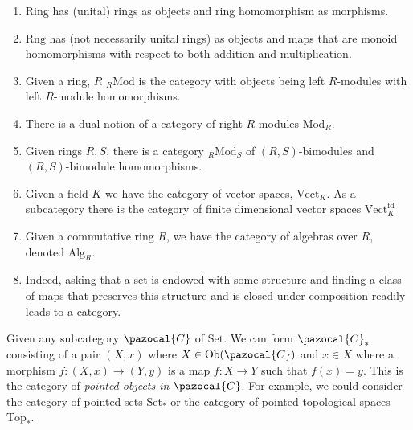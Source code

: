 \begin{example}
\begin{enumerate}
        \item $\mathrm{Ring}$ has (unital) rings as objects and ring homomorphism as morphisms. 
        \item $\mathrm{Rng}$ has (not necessarily unital rings) as objects and maps that are monoid homomorphisms with respect to both addition and multiplication. 
        \item Given a ring, $R$ $_R\mathrm{Mod}$ is the category with objects being left $R$-modules with left $R$-module homomorphisms.
        \item There is a dual notion of a category of right $R$-modules $\mathrm{Mod}_R$. 
        \item Given rings $R,S$, there is a category $_R\mathrm{Mod}_S$ of $(R,S)$-bimodules and $(R,S)$-bimodule homomorphisms. 
        \item Given a field $K$ we have the category of vector spaces, $\mathrm{Vect}_K$. As a subcategory there is the category of finite dimensional vector spaces $\mathrm{Vect}_K^\mathrm{fd}$
        \item Given a commutative ring $R$, we have the category of algebras over $R$, denoted $\mathrm{Alg}_R$. 
        \item Indeed, asking that a set is endowed with some structure and finding a class of maps that preserves this structure and is closed under composition readily leads to a category. 
    \end{enumerate}
\end{example}
\begin{example}
    Given any subcategory $\pazocal{C}$ of $\mathrm{Set}$. We can form $\pazocal{C}_\ast$ consisting of a pair $(X,x)$ where $X\in \Ob(\pazocal{C})$ and $x\in X$ where a morphism $f: (X,x)\rightarrow (Y,y)$ is a map $f:X\rightarrow Y$ such that $f(x)=y$. This is the category of \emph{pointed objects in $\pazocal{C}$}. For example, we could consider the category of pointed sets $\mathrm{Set}_\ast$ or the category of pointed topological spaces $\mathrm{Top}_\ast$.
\end{example}
